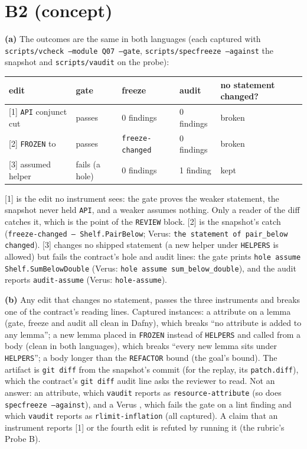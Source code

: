 \documentclass[11pt]{article}
\begin{document}
\section*{B2 (concept)}

\textbf{(a)} The outcomes are the same in both languages (each captured with
\texttt{scripts/vcheck --module Q07 --gate}, \texttt{scripts/specfreeze
--against} the snapshot and \texttt{scripts/vaudit} on the probe):
\begin{center}
\begin{tabular}{lllll}
edit & gate & freeze & audit & no statement changed? \\
\hline
{[1]} \texttt{API} conjunct cut & passes & 0 findings & 0 findings & broken \\
{[2]} \texttt{FROZEN} \dfy{<} to \dfy{<=} & passes & \texttt{freeze-changed} & 0 findings & broken \\
{[3]} assumed helper & fails (a hole) & 0 findings & 1 finding & kept \\
\end{tabular}
\end{center}
[1] is the edit no instrument sees: the gate proves the weaker statement, the
snapshot never held \texttt{API}, and a weaker  assumes nothing.
Only a reader of the diff catches it, which is the point of the \texttt{REVIEW}
block. [2] is the snapshot's catch
(\texttt{freeze-changed --- Shelf.PairBelow}; Verus: \texttt{the statement of
pair\_below changed}). [3] changes no shipped statement (a new helper under
\texttt{HELPERS} is allowed) but fails the contract's hole and audit lines: the
gate prints \texttt{hole assume Shelf.SumBelowDouble} (Verus: \texttt{hole
assume sum\_below\_double}), and the audit reports \texttt{audit-assume}
(Verus: \texttt{hole-assume}).

\textbf{(b)} Any edit that changes no statement, passes the three
instruments and breaks one of the contract's reading lines. Captured
instances: a  attribute on a lemma (gate, freeze and
audit all clean in Dafny), which breaks ``no  attribute is
added to any lemma''; a new lemma placed in \texttt{FROZEN} instead of
\texttt{HELPERS} and called from a body (clean in both languages), which breaks
``every new lemma sits under \texttt{HELPERS}''; a body longer than the
\texttt{REFACTOR} bound (the goal's bound). The artifact is \texttt{git diff}
from the snapshot's commit (for the replay, its \texttt{patch.diff}), which the
contract's \texttt{git diff} audit line asks the reviewer to read. Not an
answer: an  attribute, which \texttt{vaudit} reports as
\texttt{resource-attribute} (so does \texttt{specfreeze --against}), and a
Verus , which fails the gate on a lint finding and
which \texttt{vaudit} reports as \texttt{rlimit-inflation} (all captured). A
claim that an instrument reports [1] or the fourth edit is refuted by running
it (the rubric's Probe B).
\end{document}
